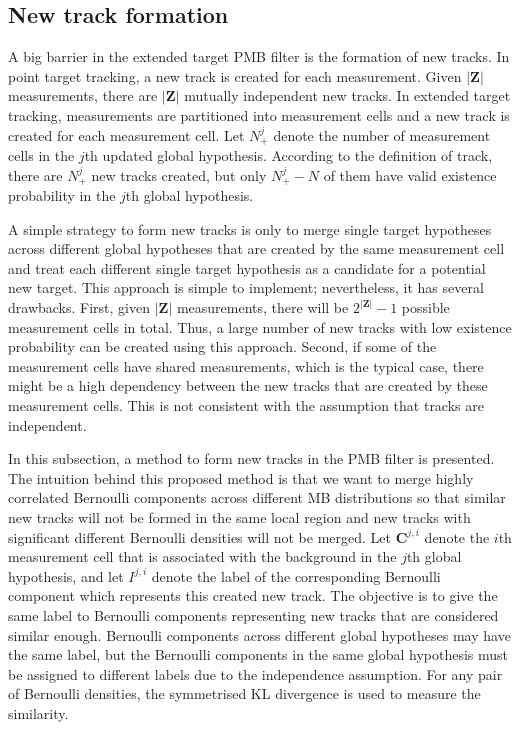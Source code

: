 \documentclass[conference]{IEEEtran}
\begin{document}
\subsection{New track formation}
A big barrier in the extended target PMB filter is the formation of new tracks. In point target tracking, a new track is created for each measurement. Given $|\mathbf{Z}|$ measurements, there are $|\mathbf{Z}|$ mutually independent new tracks. In extended target tracking, measurements are partitioned into measurement cells and a new track is created for each measurement cell. Let $N_+^j$ denote the number of measurement cells in the $j$th updated global hypothesis. According to the definition of track, there are $N_+^j$ new tracks created, but only $N_+^j-N$ of them have valid existence probability in the $j$th global hypothesis. 

A simple strategy to form new tracks is only to merge single target hypotheses across different global hypotheses that are created by the same measurement cell and treat each different single target hypothesis as a candidate for a potential new target. This approach is simple to implement; nevertheless, it has several drawbacks. First, given $|\mathbf{Z}|$ measurements, there will be $2^{|\mathbf{Z}|}-1$ possible measurement cells in total. Thus, a large number of new tracks with low existence probability can be created using this approach. Second, if some of the measurement cells have shared measurements, which is the typical case, there might be a high dependency between the new tracks that are created by these measurement cells. This is not consistent with the assumption that tracks are independent.

In this subsection, a method to form new tracks in the PMB filter is presented. The intuition behind this proposed method is that we want to merge highly correlated Bernoulli components across different MB distributions
so that similar new tracks will not be formed in the same local region and new tracks with significant different Bernoulli densities will not be merged. Let $\mathbf{C}^{j,i}$ denote the $i$th measurement cell that is associated with the background in the $j$th global hypothesis, and let $I^{j,i}$ denote the label of the corresponding Bernoulli component which represents this created new track. The objective is to give the same label to Bernoulli components representing new tracks that are considered similar enough. Bernoulli components across different global hypotheses may have the same label, but the Bernoulli components in the same global hypothesis must be assigned to different labels due to the independence assumption. For any pair of Bernoulli densities, the symmetrised KL divergence is used to measure the similarity.
\end{document}
